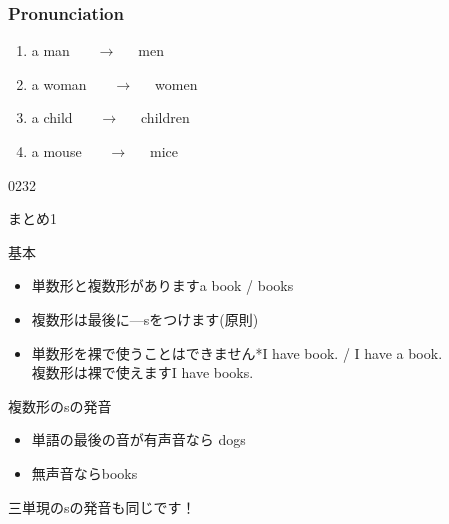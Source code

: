 \documentclass[aspectratio=169,xcolor={dvipsnames,table}]{beamer}
\newcommand{\myaudio}[1]{\href{#1}{\faVolumeUp}}
\begin{document}
\begin{frame}[plain]\frametitle{Pronunciation}

\begin{enumerate}
 \item a man ~~~\pause{}$\longrightarrow$~~~men \pause
 \item a woman ~~~\pause{}$\longrightarrow$~~~women \pause
 \item a child ~~~\pause{}$\longrightarrow$~~~children \pause
 \item a mouse ~~~\pause{}$\longrightarrow$~~~mice 
  \end{enumerate}
\pause

\bigskip

\bigskip

\mbox{}\hfill{\tiny 0232}\,{\scriptsize \myaudio{./audio/005_singular_plural_12.mp3}}
\end{frame}
\begin{frame}[plain]{まとめ1}
 \begin{block}{基本}\small
\begin{itemize}[square]
 \item  単数形と複数形があります\hfill{}a book / books
 \item 複数形は最後に---sをつけます(原則)
 \item  単数形を裸で使うことはできません\hfill{}*I have book. / I have a book.\,\,\dbend\\
複数形は裸で使えます\hfill{}I have books.\,\phantom{\dbend}\mbox{}
\end{itemize}
      \end{block}

\pause

\begin{block}{複数形のsの発音}\small
\begin{itemize}[square]
 \item 単語の最後の音が有声音なら\,\,\dbend\hfill{}dogs 
 \item \phantom{単語の最後の音が}無声音なら\hfill{}books 
\end{itemize}
\end{block}
\hfill{\scriptsize 三単現のsの発音も同じです！}
\end{frame}
\end{document}
